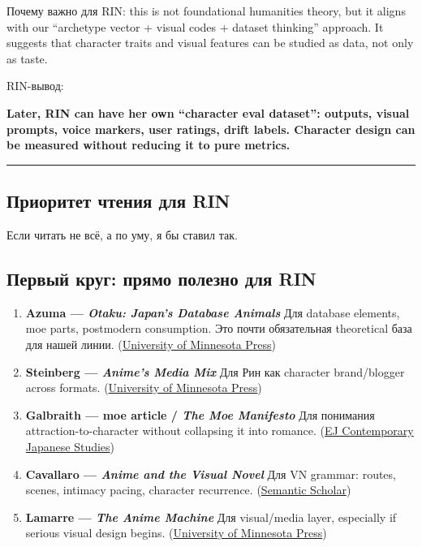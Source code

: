 Почему важно для RIN: this is not foundational humanities theory, but it
aligns with our ``archetype vector + visual codes + dataset thinking''
approach. It suggests that character traits and visual features can be
studied as data, not only as taste.

RIN-вывод:

\textbf{Later, RIN can have her own ``character eval dataset'': outputs,
visual prompts, voice markers, user ratings, drift labels. Character
design can be measured without reducing it to pure metrics.}

\begin{center}\rule{0.5\linewidth}{0.5pt}\end{center}

\subsection*{Приоритет чтения для RIN}

Если читать не всё, а по уму, я бы ставил так.

\subsection*{Первый круг: прямо полезно для RIN}

\begin{enumerate}
\def\labelenumi{\arabic{enumi}.}
\item
  \textbf{Azuma --- \emph{Otaku: Japan's Database Animals}} Для database
  elements, moe parts, postmodern consumption. Это почти обязательная
  theoretical база для нашей линии.
  (\href{https://www.upress.umn.edu/9780816653522/otaku/?utm_source=chatgpt.com}{University
  of Minnesota Press})
\item
  \textbf{Steinberg --- \emph{Anime's Media Mix}} Для Рин как character
  brand/\hspace{0pt}blogger across formats.
  (\href{https://www.upress.umn.edu/9780816675500/animes-media-mix/?utm_source=chatgpt.com}{University
  of Minnesota Press})
\item
  \textbf{Galbraith --- moe article /\hspace{0pt} \emph{The Moe Manifesto}} Для
  понимания attraction-to-character without collapsing it into romance.
  (\href{https://www.japanesestudies.org.uk/articles/2009/Galbraith.html?utm_source=chatgpt.com}{EJ
  Contemporary Japanese Studies})
\item
  \textbf{Cavallaro --- \emph{Anime and the Visual Novel}} Для VN
  grammar: routes, scenes, intimacy pacing, character recurrence.
  (\href{https://www.semanticscholar.org/paper/Anime-and-the-Visual-Novel\%3A-Narrative-Structure\%2C-at-Cavallaro/a3dc02e7820dc806af347a9095e98c9d9788abb1?utm_source=chatgpt.com}{Semantic
  Scholar})
\item
  \textbf{Lamarre --- \emph{The Anime Machine}} Для visual/\hspace{0pt}media layer,
  especially if serious visual design begins.
  (\href{https://www.upress.umn.edu/9780816651559/the-anime-machine/?utm_source=chatgpt.com}{University
  of Minnesota Press})
\end{enumerate}


